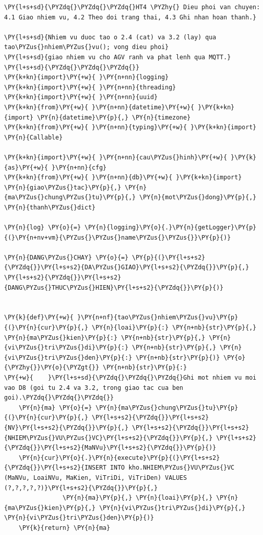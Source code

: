 \begin{Verbatim}[commandchars=\\\{\},frame=single,framerule=0.3pt,rulecolor=\color{black!40},fontsize=\footnotesize,breaklines=true]
\PY{l+s+sd}{\PYZdq{}\PYZdq{}\PYZdq{}HT4 \PYZhy{} Dieu phoi van chuyen: 4.1 Giao nhiem vu, 4.2 Theo doi trang thai, 4.3 Ghi nhan hoan thanh.}

\PY{l+s+sd}{Nhiem vu duoc tao o 2.4 (cat) va 3.2 (lay) qua tao\PYZus{}nhiem\PYZus{}vu(); vong dieu phoi}
\PY{l+s+sd}{giao nhiem vu cho AGV ranh va phat lenh qua MQTT.}
\PY{l+s+sd}{\PYZdq{}\PYZdq{}\PYZdq{}}
\PY{k+kn}{import}\PY{+w}{ }\PY{n+nn}{logging}
\PY{k+kn}{import}\PY{+w}{ }\PY{n+nn}{threading}
\PY{k+kn}{import}\PY{+w}{ }\PY{n+nn}{uuid}
\PY{k+kn}{from}\PY{+w}{ }\PY{n+nn}{datetime}\PY{+w}{ }\PY{k+kn}{import} \PY{n}{datetime}\PY{p}{,} \PY{n}{timezone}
\PY{k+kn}{from}\PY{+w}{ }\PY{n+nn}{typing}\PY{+w}{ }\PY{k+kn}{import} \PY{n}{Callable}

\PY{k+kn}{import}\PY{+w}{ }\PY{n+nn}{cau\PYZus{}hinh}\PY{+w}{ }\PY{k}{as}\PY{+w}{ }\PY{n+nn}{cfg}
\PY{k+kn}{from}\PY{+w}{ }\PY{n+nn}{db}\PY{+w}{ }\PY{k+kn}{import} \PY{n}{giao\PYZus{}tac}\PY{p}{,} \PY{n}{ma\PYZus{}chung\PYZus{}tu}\PY{p}{,} \PY{n}{mot\PYZus{}dong}\PY{p}{,} \PY{n}{thanh\PYZus{}dict}

\PY{n}{log} \PY{o}{=} \PY{n}{logging}\PY{o}{.}\PY{n}{getLogger}\PY{p}{(}\PY{n+nv+vm}{\PYZus{}\PYZus{}name\PYZus{}\PYZus{}}\PY{p}{)}

\PY{n}{DANG\PYZus{}CHAY} \PY{o}{=} \PY{p}{(}\PY{l+s+s2}{\PYZdq{}}\PY{l+s+s2}{DA\PYZus{}GIAO}\PY{l+s+s2}{\PYZdq{}}\PY{p}{,} \PY{l+s+s2}{\PYZdq{}}\PY{l+s+s2}{DANG\PYZus{}THUC\PYZus{}HIEN}\PY{l+s+s2}{\PYZdq{}}\PY{p}{)}


\PY{k}{def}\PY{+w}{ }\PY{n+nf}{tao\PYZus{}nhiem\PYZus{}vu}\PY{p}{(}\PY{n}{cur}\PY{p}{,} \PY{n}{loai}\PY{p}{:} \PY{n+nb}{str}\PY{p}{,} \PY{n}{ma\PYZus{}kien}\PY{p}{:} \PY{n+nb}{str}\PY{p}{,} \PY{n}{vi\PYZus{}tri\PYZus{}di}\PY{p}{:} \PY{n+nb}{str}\PY{p}{,} \PY{n}{vi\PYZus{}tri\PYZus{}den}\PY{p}{:} \PY{n+nb}{str}\PY{p}{)} \PY{o}{\PYZhy{}}\PY{o}{\PYZgt{}} \PY{n+nb}{str}\PY{p}{:}
\PY{+w}{    }\PY{l+s+sd}{\PYZdq{}\PYZdq{}\PYZdq{}Ghi mot nhiem vu moi vao D8 (goi tu 2.4 va 3.2, trong giao tac cua ben goi).\PYZdq{}\PYZdq{}\PYZdq{}}
    \PY{n}{ma} \PY{o}{=} \PY{n}{ma\PYZus{}chung\PYZus{}tu}\PY{p}{(}\PY{n}{cur}\PY{p}{,} \PY{l+s+s2}{\PYZdq{}}\PY{l+s+s2}{NV}\PY{l+s+s2}{\PYZdq{}}\PY{p}{,} \PY{l+s+s2}{\PYZdq{}}\PY{l+s+s2}{NHIEM\PYZus{}VU\PYZus{}VC}\PY{l+s+s2}{\PYZdq{}}\PY{p}{,} \PY{l+s+s2}{\PYZdq{}}\PY{l+s+s2}{MaNVu}\PY{l+s+s2}{\PYZdq{}}\PY{p}{)}
    \PY{n}{cur}\PY{o}{.}\PY{n}{execute}\PY{p}{(}\PY{l+s+s2}{\PYZdq{}}\PY{l+s+s2}{INSERT INTO kho.NHIEM\PYZus{}VU\PYZus{}VC (MaNVu, LoaiNVu, MaKien, ViTriDi, ViTriDen) VALUES (?,?,?,?,?)}\PY{l+s+s2}{\PYZdq{}}\PY{p}{,}
                \PY{n}{ma}\PY{p}{,} \PY{n}{loai}\PY{p}{,} \PY{n}{ma\PYZus{}kien}\PY{p}{,} \PY{n}{vi\PYZus{}tri\PYZus{}di}\PY{p}{,} \PY{n}{vi\PYZus{}tri\PYZus{}den}\PY{p}{)}
    \PY{k}{return} \PY{n}{ma}



\end{Verbatim}
